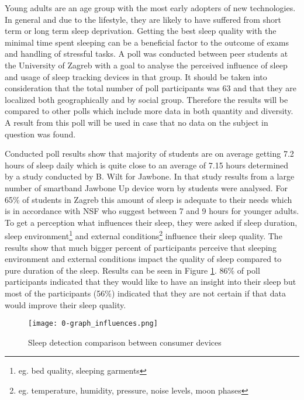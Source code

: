 Young adults are an age group with the most early adopters of new technologies. In general and due to the lifestyle, they are likely to have suffered from short term or long term sleep deprivation. Getting the best sleep quality with the minimal time spent sleeping can be a beneficial factor to the outcome of exams and handling of stressful tasks. A poll was conducted between peer students at the University of Zagreb with a goal to analyse the perceived influence of sleep and usage of sleep tracking devices in that group. It should be taken into consideration that the total number of poll participants was 63 and that they are localized both geographically and by social group. Therefore the results will be compared to other polls which include more data in both quantity and diversity. A result from this poll will be used in case that no data on the subject in question was found.

Conducted poll results show that majority of students are on average getting 7.2 hours of sleep daily which is quite close to an average of 7.15 hours determined by a study conducted by B. Wilt for Jawbone\cite{Jawbone}. In that study results from a large number of smartband Jawbone Up device worn by students were analysed. For 65\% of students in Zagreb this amount of sleep is adequate to their needs which is in accordance with NSF who suggest between 7 and 9 hours for younger adults\cite{NSF}. To get a perception what influences their sleep, they were asked if sleep duration, sleep environment\footnote{eg. bed quality, sleeping garments} and external conditions\footnote{eg. temperature, humidity, pressure, noise levels, moon phases} influence their sleep quality. The results show that much bigger percent of participants perceive that sleeping environment and external conditions impact the quality of sleep compared to pure duration of the sleep. Results can be seen in Figure \ref{fig:influence}. 86\% of poll participants indicated that they would like to have an insight into their sleep but most of the participants (56\%) indicated that they are not certain if that data would improve their sleep quality.

\begin{figure}[h]
  \begin{center}
    \texttt{[image: 0-graph\_influences.png]}
  \end{center}
  \caption{Sleep detection comparison between consumer devices}
  \label{fig:influence}
\end{figure}

